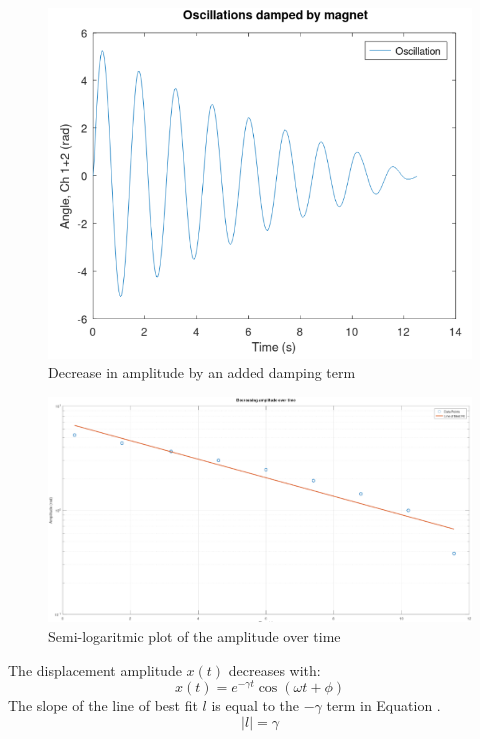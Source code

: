 \begin{figure}[h!]
  \centering
  \includegraphics[width=1\textwidth]{oscillations/images/underdamped}
  \caption{Decrease in amplitude by an added damping term}
  \label{fig:underdamped}
\end{figure}

\begin{figure}[h!]
  \centering
  \includegraphics[width=1\textwidth]{oscillations/images/log}
  \caption{Semi-logaritmic plot of the amplitude over time}
  \label{fig:log of damping factor}
\end{figure}

The displacement amplitude $x(t)$ decreases with:
\begin{equation}
  x(t) = e^{-\gamma t} \cos(\omega t + \phi) 
  \label{eq:displacement amplitude}
\end{equation}
The slope of the line of best fit $l$ is equal to the $-\gamma$ term in Equation .
\begin{equation}
  |l| = \gamma 
\end{equation}

